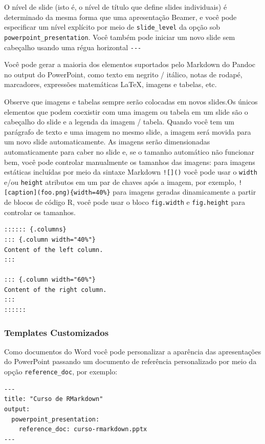 \documentclass[
]{book}
\begin{document}
O nível de slide (isto é, o nível de título que define slides individuais) é determinado da mesma forma que uma apresentação Beamer, e você pode especificar um nível explícito por meio de \texttt{slide\_level} da opção sob \texttt{powerpoint\_presentation}. Você também pode iniciar um novo slide sem cabeçalho usando uma régua horizontal \texttt{-\/-\/-}

Você pode gerar a maioria dos elementos suportados pelo Markdown do Pandoc no output do PowerPoint, como texto em negrito / itálico, notas de rodapé, marcadores, expressões matemáticas LaTeX, imagens e tabelas, etc.

Observe que imagens e tabelas sempre serão colocadas em novos slides.Os únicos elementos que podem coexistir com uma imagem ou tabela em um slide são o cabeçalho do slide e a legenda da imagem / tabela. Quando você tem um parágrafo de texto e uma imagem no mesmo slide, a imagem será movida para um novo slide automaticamente. As imagens serão dimensionadas automaticamente para caber no slide e, se o tamanho automático não funcionar bem, você pode controlar manualmente os tamanhos das imagens: para imagens estáticas incluídas por meio da sintaxe Markdown \texttt{!{[}{]}()} você pode usar o \texttt{width} e/ou \texttt{height} atributos em um par de chaves após a imagem, por exemplo, \texttt{!{[}caption{]}(foo.png)\{width=40\%\}} para imagens geradas dinamicamente a partir de blocos de código R, você pode usar o bloco \texttt{fig.width} e \texttt{fig.height} para controlar os tamanhos.

\begin{verbatim}
:::::: {.columns}
::: {.column width="40%"}
Content of the left column.
:::

::: {.column width="60%"}
Content of the right column.
:::
::::::
\end{verbatim}

\hypertarget{templates-customizados-1}{%
\subsubsection*{Templates Customizados}\label{templates-customizados-1}}

Como documentos do Word você pode personalizar a aparência das apresentações do PowerPoint passando um documento de referência personalizado por meio da opção \texttt{reference\_doc}, por exemplo:

\begin{verbatim}
---
title: "Curso de RMarkdown"
output:
  powerpoint_presentation:
    reference_doc: curso-rmarkdown.pptx
---
\end{verbatim}
\end{document}
